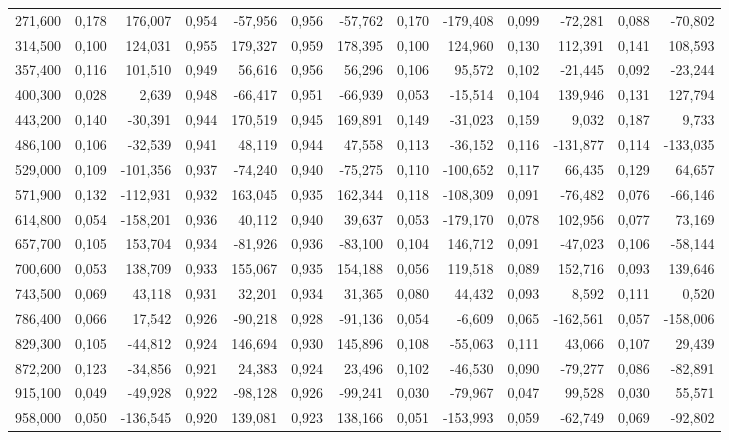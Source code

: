 \begin{longtable}{rrrrrrrrrrrrr}
271,600 & 0,178 & 176,007 & 0,954 & -57,956 & 0,956 & -57,762 & 0,170 & -179,408 & 0,099 & -72,281 & 0,088 & -70,802\\
314,500 & 0,100 & 124,031 & 0,955 & 179,327 & 0,959 & 178,395 & 0,100 & 124,960 & 0,130 & 112,391 & 0,141 & 108,593\\
357,400 & 0,116 & 101,510 & 0,949 & 56,616 & 0,956 & 56,296 & 0,106 & 95,572 & 0,102 & -21,445 & 0,092 & -23,244\\
400,300 & 0,028 & 2,639 & 0,948 & -66,417 & 0,951 & -66,939 & 0,053 & -15,514 & 0,104 & 139,946 & 0,131 & 127,794\\
443,200 & 0,140 & -30,391 & 0,944 & 170,519 & 0,945 & 169,891 & 0,149 & -31,023 & 0,159 & 9,032 & 0,187 & 9,733\\
486,100 & 0,106 & -32,539 & 0,941 & 48,119 & 0,944 & 47,558 & 0,113 & -36,152 & 0,116 & -131,877 & 0,114 & -133,035\\
529,000 & 0,109 & -101,356 & 0,937 & -74,240 & 0,940 & -75,275 & 0,110 & -100,652 & 0,117 & 66,435 & 0,129 & 64,657\\
571,900 & 0,132 & -112,931 & 0,932 & 163,045 & 0,935 & 162,344 & 0,118 & -108,309 & 0,091 & -76,482 & 0,076 & -66,146\\
614,800 & 0,054 & -158,201 & 0,936 & 40,112 & 0,940 & 39,637 & 0,053 & -179,170 & 0,078 & 102,956 & 0,077 & 73,169\\
657,700 & 0,105 & 153,704 & 0,934 & -81,926 & 0,936 & -83,100 & 0,104 & 146,712 & 0,091 & -47,023 & 0,106 & -58,144\\
700,600 & 0,053 & 138,709 & 0,933 & 155,067 & 0,935 & 154,188 & 0,056 & 119,518 & 0,089 & 152,716 & 0,093 & 139,646\\
743,500 & 0,069 & 43,118 & 0,931 & 32,201 & 0,934 & 31,365 & 0,080 & 44,432 & 0,093 & 8,592 & 0,111 & 0,520\\
786,400 & 0,066 & 17,542 & 0,926 & -90,218 & 0,928 & -91,136 & 0,054 & -6,609 & 0,065 & -162,561 & 0,057 & -158,006\\
829,300 & 0,105 & -44,812 & 0,924 & 146,694 & 0,930 & 145,896 & 0,108 & -55,063 & 0,111 & 43,066 & 0,107 & 29,439\\
872,200 & 0,123 & -34,856 & 0,921 & 24,383 & 0,924 & 23,496 & 0,102 & -46,530 & 0,090 & -79,277 & 0,086 & -82,891\\
915,100 & 0,049 & -49,928 & 0,922 & -98,128 & 0,926 & -99,241 & 0,030 & -79,967 & 0,047 & 99,528 & 0,030 & 55,571\\
958,000 & 0,050 & -136,545 & 0,920 & 139,081 & 0,923 & 138,166 & 0,051 & -153,993 & 0,059 & -62,749 & 0,069 & -92,802\\

\end{longtable}
